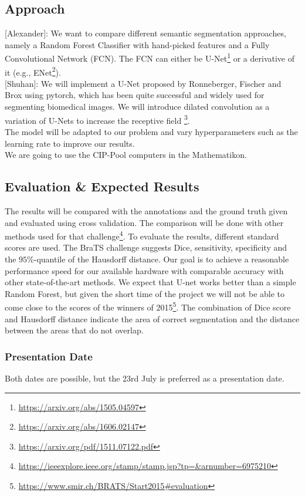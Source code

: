 \documentclass[a4paper,12pt]{article}
\begin{document}
\subsection{Approach}

[Alexander]: We want to compare different semantic segmentation approaches, namely a Random
Forest Classifier with hand-picked features and a Fully Convolutional Network
(FCN). The FCN can either be
U-Net\footnote{\url{https://arxiv.org/abs/1505.04597}} or a derivative of it
(e.g., ENet\footnote{\url{https://arxiv.org/abs/1606.02147}}).\\

[Shuhan]: We will implement a U-Net proposed by Ronneberger, Fischer and Brox using pytorch, which has been quite successful and widely used for segmenting biomedical images. We will introduce dilated convolution as a variation of U-Nets to increase the receptive field \footnote[3]{\url{https://arxiv.org/pdf/1511.07122.pdf}}.\\
The model will be adapted to our problem and vary hyperparameters such as the learning rate to improve our results.\\

We are going to use the CIP-Pool computers in the Mathematikon.
\subsection{Evaluation \& Expected Results}


The results will be compared with the annotations and the ground truth given and evaluated using cross validation. The comparison will be done with other methods used for that challenge\footnote{\url{https://ieeexplore.ieee.org/stamp/stamp.jsp?tp=&arnumber=6975210}}. 
To evaluate the results, different standard scores are used. The BraTS
challenge suggests Dice, sensitivity, specificity and the $95\%$-quantile of
the Hausdorff distance.  Our goal is to achieve a reasonable performance speed for our available hardware with comparable accuracy with other state-of-the-art methods. We expect that U-net works better than a simple Random
Forest, but given the short time of the project we will not be able to come
close to the scores of the winners of
2015\footnote{\url{https://www.smir.ch/BRATS/Start2015\#evaluation}}. The
combination of Dice score and Hausdorff distance indicate the area of correct
segmentation and the distance between the areas that do not overlap.

\subsubsection*{Presentation Date}
Both dates are possible, but the 23rd July is preferred as a presentation date.










\end{document}
